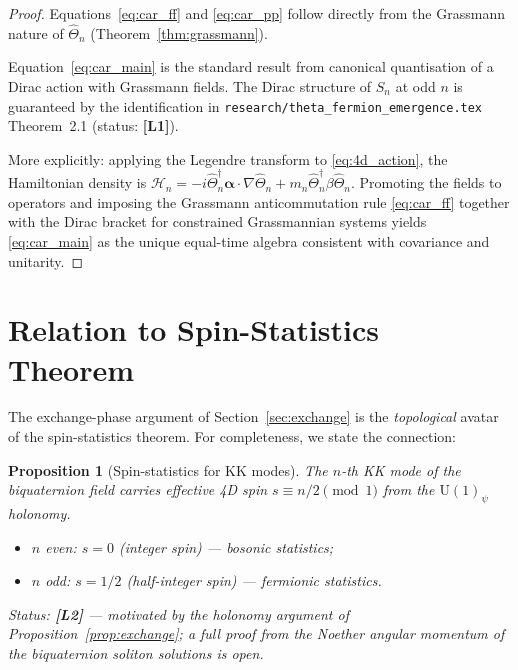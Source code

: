 \documentclass[11pt,a4paper]{article}
\newtheorem{proposition}{Proposition}
\newcommand{\Lone}{\textbf{[L1]}}
\newcommand{\Ltwo}{\textbf{[L2]}}
\begin{document}
\begin{proof}
  Equations~\eqref{eq:car_ff} and \eqref{eq:car_pp} follow directly from
  the Grassmann nature of $\hat\Theta_n$ (Theorem~\ref{thm:grassmann}).
  
  Equation~\eqref{eq:car_main} is the standard result from canonical
  quantisation of a Dirac action with Grassmann fields.  The Dirac structure
  of $S_n$ at odd $n$ is guaranteed by the identification in
  \texttt{research/theta\_fermion\_emergence.tex} Theorem~2.1 (status: \Lone).
  
  More explicitly: applying the Legendre transform to \eqref{eq:4d_action},
  the Hamiltonian density is
  $\mathcal{H}_n = -i\hat\Theta_n^\dagger\boldsymbol{\alpha}\cdot\nabla\hat\Theta_n
    + m_n\hat\Theta_n^\dagger\beta\hat\Theta_n$.
  Promoting the fields to operators and imposing the Grassmann anticommutation
  rule \eqref{eq:car_ff} together with the Dirac bracket for constrained
  Grassmannian systems yields \eqref{eq:car_main} as the unique
  equal-time algebra consistent with covariance and unitarity.
\end{proof}

\section{Relation to Spin-Statistics Theorem}
\label{sec:spin_stats}

The exchange-phase argument of Section~\ref{sec:exchange} is the
\emph{topological} avatar of the spin-statistics theorem.  For completeness,
we state the connection:

\begin{proposition}[Spin-statistics for KK modes]\label{prop:spin_stat}
  The $n$-th KK mode of the biquaternion field carries effective 4D spin
  $s \equiv n/2 \pmod{1}$ from the $\mathrm{U}(1)_\psi$ holonomy.
  \begin{itemize}
    \item $n$ even: $s = 0$ (integer spin) — bosonic statistics;
    \item $n$ odd: $s = 1/2$ (half-integer spin) — fermionic statistics.
  \end{itemize}
  Status: \Ltwo{} — motivated by the holonomy argument of
  Proposition~\ref{prop:exchange}; a full proof from the Noether angular
  momentum of the biquaternion soliton solutions is open.
\end{proposition}
\end{document}
